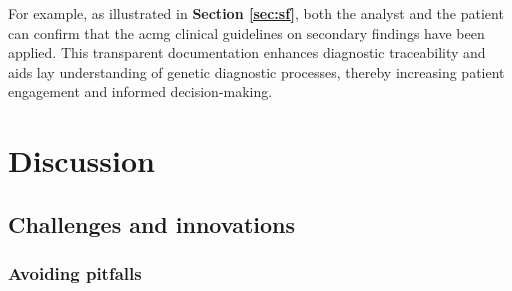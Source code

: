For example, as illustrated in \textbf{Section \ref{sec:sf}}, both the analyst and the patient can confirm that the \ac{acmg} clinical guidelines on secondary findings have been applied. This transparent documentation enhances diagnostic traceability and aids lay understanding of genetic diagnostic processes, thereby increasing patient engagement and informed decision-making.


\section{Discussion}
\subsection{Challenges and innovations}
\subsubsection{Avoiding pitfalls}
%

